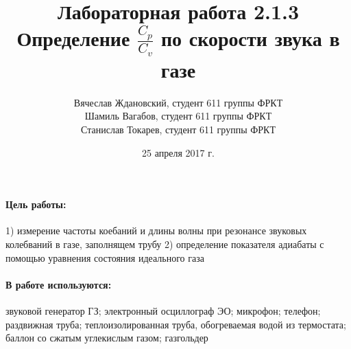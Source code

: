 \documentclass[a4paper]{article}
\title{Лабораторная работа 2.1.3 \\Определение $\frac{C_p}{C_v}$ по скорости звука в газе}
\date{25 апреля 2017 г.}
\author{Вячеслав Ждановский, студент 611 группы ФРКТ\\
Шамиль Вагабов, студент 611 группы ФРКТ\\
Станислав Токарев, студент 611 группы ФРКТ}
\begin{document}
	\maketitle
	\newpage
	\paragraph{Цель работы:} 1) измерение частоты коебаний и длины волны при резонансе звуковых колебваний в газе, заполнящем трубу 2) определение показателя адиабаты с помощью уравнения состояния идеального газа
	\paragraph{В работе используются:} звуковой генератор ГЗ; электронный осциллограф ЭО; микрофон; телефон; раздвижная труба; теплоизолированная труба, обогреваемая водой из термостата; баллон со сжатым углекислым газом; газгольдер
\end{document}
